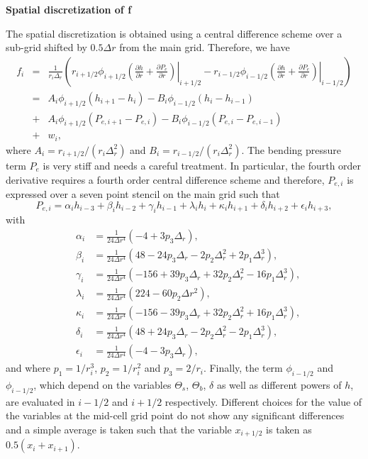 \vspace{.5cm} \textbf{Spatial discretization of f} \vspace{.5cm}

The  spatial discretization  is  obtained using  a central  difference
scheme  over  a  sub-grid  shifted  by $0.5\Delta  r$  from  the  main
grid. Therefore, we have
\begin{eqnarray}
  f_i&=&\frac{1}{r_i \Delta_r}\left(r_{i+1/2}\phi_{i+1/2}\left.\left(\frac{\partial h}{\partial r}+\frac{\partial P_e}{\partial r}\right)\right|_{i+1/2}-r_{i-1/2}\phi_{i-1/2}\left.\left(\frac{\partial h}{\partial r}+\frac{\partial P_e}{\partial r}\right)\right|_{i-1/2}\right)\nonumber\\
     &=&A_i\phi_{i+1/2}\left(h_{i+1}-h_i\right)-B_i\phi_{i-1/2}\left(h_{i}-h_{i-1}\right)\nonumber\\
     &+&A_i\phi_{i+1/2}\left(P_{e,i+1}-P_{e,i}\right)-B_i\phi_{i-1/2}\left(P_{e,i}-P_{e,i-1}\right)\nonumber\\
     &+&w_i,\label{C4-Num-3}
\end{eqnarray}
where                $A_i=r_{i+1/2}/(r_i\Delta_r^2)$               and
$B_i=r_{i-1/2}/(r_i\Delta_r^2)$.   The bending  pressure  term $P_e$  is
very stiff and  needs a careful treatment.  In  particular, the fourth
order derivative requires a fourth order central difference scheme and
therefore, $P_{e,i}$ is  expressed over a seven point stencil  on the main
grid such that
\begin{equation}
  P_{e,i}=   \alpha_{i}h_{i-3}  +   \beta_{i}h_{i-2}+\gamma_{i}  h_{i-1}
  +\lambda_{i}h_{i}+\kappa_{i}h_{i+1}+\delta_ih_{i+2}+\epsilon_ih_{i+3},
  \label{C4-Num-4}
\end{equation}
with
\begin{eqnarray}
  &\alpha_{i}&=\frac{1}{24\Delta r^{4}}\left(-4+3p_3\Delta_r \right)\nonumber ,\\
  &\beta_{i}&=\frac{1}{24\Delta r^{4}}\left(48-24p_3\Delta_r-2p_2\Delta_r^2+2p_1\Delta_r^3\right) \nonumber,\\
  &\gamma_{i}&=\frac{1}{24\Delta r^{4}}\left(-156+39p_3\Delta_r+32p_2\Delta_r^2-16p_1\Delta_r^3\right)\nonumber,\\
  &\lambda_{i}&=\frac{1}{24\Delta r^{4}}\left(224-60p_2\Delta r^{2}\right) \nonumber,\\
  &\kappa_{i}&=\frac{1}{24\Delta r^{4}}\left( -156-39p_3\Delta_r+32p_2\Delta_r^2+16p_1\Delta_r^3\right)\nonumber,\\
  &\delta_{i}&=\frac{1}{24\Delta r^{4}}\left( 48+24p_3\Delta_r-2p_2\Delta_r^2-2p_1\Delta_r^3\right) \nonumber,\\
  &\epsilon_{i}&=\frac{1}{24\Delta r^{4}}\left(-4-3p_3\Delta_r \right),\nonumber
\end{eqnarray}
and where $p_1=1/r_i^3$, $p_2=1/r_i^2$ and $p_3 = 2/r_i$. Finally, the
term $\phi_{i-1/2}$ and $\phi_{i-1/2}$,  which depend on the variables
$\Theta_s$, $\Theta_b$, $\delta$ as well as different powers of $h$, are evaluated
in $i-1/2$ and  $i+1/2$ respectively. Different choices  for the value
of  the  variables  at  the  mid-cell  grid  point  do  not  show  any
significant differences  and a simple  average is taken such  that the
variable $x_{i+1/2}$ is taken as $0.5(x_i+x_{i+1})$.

